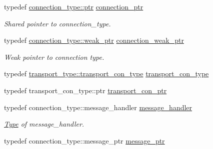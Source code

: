 \begin{DoxyCompactItemize}
\mbox{\label{classwebsocketpp_1_1endpoint_aa90d289d870c500be228ee1dea75b8b2}} 
typedef \mbox{\hyperlink{classwebsocketpp_1_1connection_ab910d42e3bde91546183cc54642f32ab}{connection\+\_\+type\+::ptr}} \mbox{\hyperlink{classwebsocketpp_1_1endpoint_aa90d289d870c500be228ee1dea75b8b2}{connection\+\_\+ptr}}
\begin{DoxyCompactList}\small\item\em Shared pointer to connection\+\_\+type. \end{DoxyCompactList}\item 
\mbox{\label{classwebsocketpp_1_1endpoint_afc1de254d2c4cf68ef29aae7189edb26}} 
typedef \mbox{\hyperlink{classwebsocketpp_1_1connection_ac2905dcf6418c52ec9685f9f59b86e3e}{connection\+\_\+type\+::weak\+\_\+ptr}} \mbox{\hyperlink{classwebsocketpp_1_1endpoint_afc1de254d2c4cf68ef29aae7189edb26}{connection\+\_\+weak\+\_\+ptr}}
\begin{DoxyCompactList}\small\item\em Weak pointer to connection type. \end{DoxyCompactList}\item 
typedef \mbox{\hyperlink{classwebsocketpp_1_1transport_1_1asio_1_1endpoint_a75f3102766fd3ba8230e99a2b0e00457}{transport\+\_\+type\+::transport\+\_\+con\+\_\+type}} \mbox{\hyperlink{classwebsocketpp_1_1endpoint_aaec9d745cafcee505c63efff421e3dff}{transport\+\_\+con\+\_\+type}}
\item 
typedef transport\+\_\+con\+\_\+type\+::ptr \mbox{\hyperlink{classwebsocketpp_1_1endpoint_a22be3833280c548d724298eba0f00b2a}{transport\+\_\+con\+\_\+ptr}}
\item 
\mbox{\label{classwebsocketpp_1_1endpoint_afa2109f793a8d8d90599ea339bbcd8e5}} 
typedef connection\+\_\+type\+::message\+\_\+handler \mbox{\hyperlink{classwebsocketpp_1_1endpoint_afa2109f793a8d8d90599ea339bbcd8e5}{message\+\_\+handler}}
\begin{DoxyCompactList}\small\item\em \mbox{\hyperlink{struct_type}{Type}} of message\+\_\+handler. \end{DoxyCompactList}\item 
\mbox{\label{classwebsocketpp_1_1endpoint_a585ecbbfd9689d4e4229e4c8378bd672}} 
typedef connection\+\_\+type\+::message\+\_\+ptr \mbox{\hyperlink{classwebsocketpp_1_1endpoint_a585ecbbfd9689d4e4229e4c8378bd672}{message\+\_\+ptr}}

\end{DoxyCompactItemize}
